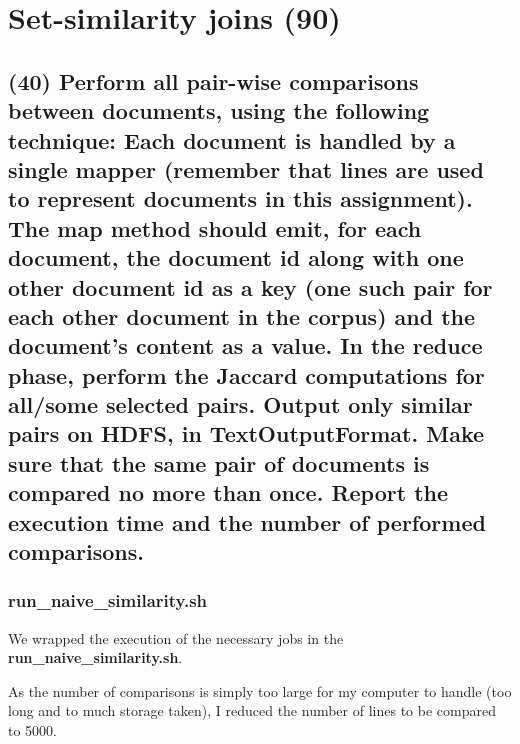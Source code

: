 \documentclass[a4paper,10pt]{article}
\begin{document}
\section{Set-similarity joins (90)}
\subsection{(40) Perform all pair-wise comparisons between documents, using the following
technique: Each document is handled by a single mapper (remember that lines are
used to represent documents in this assignment). The map method should emit, for
each document, the document id along with one other document id as a key (one such
pair for each other document in the corpus) and the document’s content as a value.
In the reduce phase, perform the Jaccard computations for all/some selected pairs.
Output only similar pairs on HDFS, in TextOutputFormat.
Make sure that the same pair of documents is compared no more than once. Report
the execution time and the number of performed comparisons.}
\subsubsection{run\_naive\_similarity.sh}
We wrapped the execution of the necessary jobs in the \textbf{run\_naive\_similarity.sh}.

As the number of comparisons is simply too large for my computer to handle (too long
and to much storage taken), I reduced the number of lines to be compared to 5000.

\end{document}
